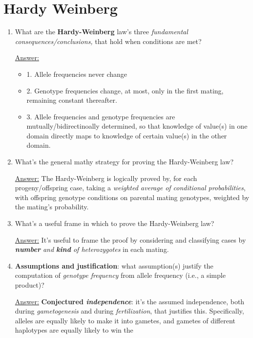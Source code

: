 \documentclass{article}
\newenvironment{QandA}{\begin{enumerate}[label=\bfseries Q\arabic*.]}
                       {\end{enumerate}}
\newenvironment{answered}{\par\normalfont\underline{Answer:}}{}
\begin{document}
\section{Hardy Weinberg}
\begin{QandA}
  \item{What are the \textbf{Hardy-Weinberg} law's three \textit{fundamental consequences/conclusions,} that hold when conditions are met?}
    \begin{answered}
    \begin{itemize}
      \item{1. Allele frequencies never change}
      \item{2. Genotype frequencies change, at most, only in the first mating, remaining constant thereafter.}
      \item{3. Allele frequencies and genotype frequencies are mutually/bidirectinoally determined, so that knowledge of value(s) in one domain directly maps to knowledge of certain value(s) in the other domain.}
    \end{itemize}
    \end{answered}
  \item{What's the general mathy strategy for proving the Hardy-Weinberg law?}
    \begin{answered}
    The Hardy-Weinberg is logically proved by, for each progeny/offspring case, taking a \textit{weighted average of conditional probabilities}, with offspring genotype conditions on parental mating genotypes, weighted by the mating's probability.
    \end{answered}
  \item{What's a useful frame in which to prove the Hardy-Weinberg law?}
    \begin{answered}
    It's useful to frame the proof by considering and classifying cases by \textit{\textbf{number} and \textbf{kind} of heterozygotes} in each mating.
    \end{answered}
  \item{\textbf{Assumptions and justification}: what assumption(s) justify the computation of \textit{genotype frequency} from allele frequency (i.e., a simple product)?}
    \begin{answered}
    \textbf{Conjectured \textit{independence}}: it's the assumed independence, both during \textit{gametogenesis} and during \textit{fertilization}, that justifies this. Specifically, alleles are equally likely to make it into gametes, and gametes of different haplotypes are equally likely to win the 

\end{answered}
\end{QandA}
\end{document}
